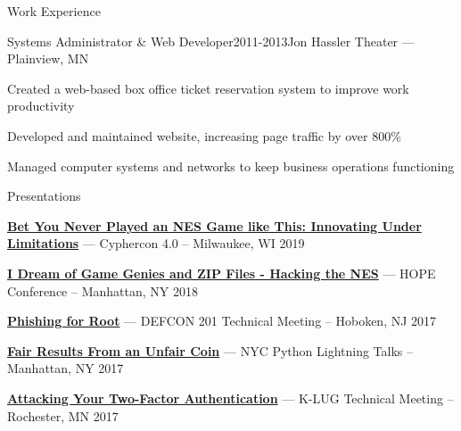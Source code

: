 \documentclass{resume} %
\begin{document}
\begin{rSection}{Work Experience}
\begin{rSubsection}{Systems Administrator \& Web Developer}{2011-2013}{Jon Hassler Theater --- Plainview, MN}{}
\item Created a web-based box office ticket reservation system to improve work productivity
\item Developed and maintained website, increasing page traffic by over 800\%
\item Managed computer systems and networks to keep business operations functioning
\end{rSubsection}


\end{rSection}


\begin{rListSection}{Presentations}

\item \href{https://vigrey.com/presentations/2019-04-12-cyphercon.pdf}{\textbf{Bet You Never Played an NES Game like This: Innovating Under Limitations}} --- Cyphercon 4.0 -- Milwaukee, WI \hfill 2019
\item \href{https://vigrey.com/presentations/2018-07-20-hope.pdf}{\textbf{I Dream of Game Genies and ZIP Files - Hacking the NES}} --- HOPE Conference -- Manhattan, NY \hfill 2018
\item \href{https://vigrey.com/presentations/2017-10-20-defcon-201.pdf}{\textbf{Phishing for Root}} --- DEFCON 201 Technical Meeting -- Hoboken, NJ \hfill 2017
\item \href{https://vigrey.com/zpresentations/2017-10-12-nyc-python.pdf}{\textbf{Fair Results From an Unfair Coin}} --- NYC Python Lightning Talks -- Manhattan, NY \hfill 2017
\item \href{https://vigrey.com/presentations/2017-06-08-k-lug.pdf}{\textbf{Attacking Your Two-Factor Authentication}} --- K-LUG Technical Meeting -- Rochester, MN \hfill 2017
\end{rListSection}


\pagebreak

 
\end{document}
